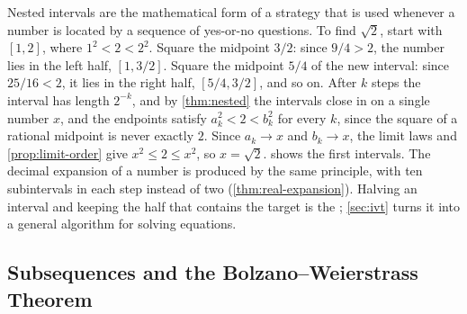 Nested intervals are the mathematical form of a strategy that is used whenever a number is located by a sequence of yes-or-no questions. To find $\sqrt2$, start with $[1,2]$, where $1^2<2<2^2$. Square the midpoint $3/2$: since $9/4>2$, the number lies in the left half, $[1,3/2]$. Square the midpoint $5/4$ of the new interval: since $25/16<2$, it lies in the right half, $[5/4,3/2]$, and so on. After $k$ steps the interval has length $2^{-k}$, and by \cref{thm:nested} the intervals close in on a single number $x$, and the endpoints satisfy $a_k^2<2<b_k^2$ for every $k$, since the square of a rational midpoint is never exactly $2$. Since $a_k\to x$ and $b_k\to x$, the limit laws and \cref{prop:limit-order} give $x^2\le2\le x^2$, so $x=\sqrt2$.  shows the first intervals. The decimal expansion of a number is produced by the same principle, with ten subintervals in each step instead of two (\cref{thm:real-expansion}). Halving an interval and keeping the half that contains the target is the ; \cref{sec:ivt} turns it into a general algorithm for solving equations.

\begin{figure}
\end{figure}

\subsection{Subsequences and the Bolzano--Weierstrass Theorem}

